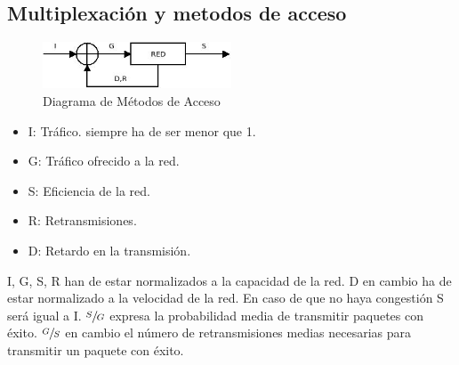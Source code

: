 \subsection{Multiplexación y metodos de acceso}
\begin{figure}[H]
\centering
\includegraphics[width=0.5\textwidth]{Imagen/diametodosacceso.jpg}
\caption{Diagrama de Métodos de Acceso}
\end{figure}
\begin{itemize}
\item I: Tráfico. siempre ha de ser menor que 1.
\item G: Tráfico ofrecido a la red.
\item S: Eficiencia de la red.
\item R: Retransmisiones.
\item D: Retardo en la transmisión.
\end{itemize}
I, G, S, R han de estar normalizados a la capacidad de la red. D en cambio ha de estar normalizado a la velocidad de la red. En caso de que no haya congestión S será igual a I. $\sfrac{S}{G}$ expresa la probabilidad media de transmitir paquetes con éxito. $\sfrac{G}{S}$ en cambio el número de retransmisiones medias necesarias para transmitir un paquete con éxito.
